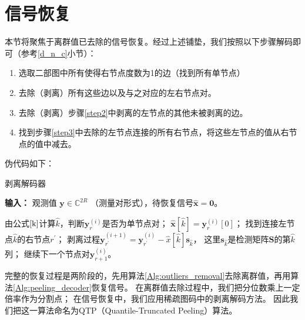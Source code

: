 \documentclass[AutoFakeBold]{LZUThesis}
\begin{document}
\section{信号恢复}
\label{solu}

本节将聚焦于离群值已去除的信号恢复。经过上述铺垫，我们按照以下步骤解码即可（参考\ref{d_n_c}小节）：

\begin{enumerate}[1) ]
    \item 选取二部图中所有使得右节点度数为1的边（找到所有单节点）
    \item \label{step2}去除（剥离）所有这些边以及与之对应的左右节点对。
    \item \label{step3}去除（剥离）步骤\ref{step2}中剥离的左节点的其他未被剥离的边。
    \item 找到步骤\ref{step3}中去除的左节点连接的所有右节点，将这些左节点的值从右节点的值中减去。
\end{enumerate}

伪代码如下：

\begin{algorithm}[H]
    \caption{剥离解码器\label{Alg:peeling_decoder}}
    \hspace*{0.02in} {\bf 输入：} 
    观测值 $ \mathbf{y} \in \mathbb{C}^{2R} $ （测量对形式），待恢复信号$\mathbf{\hat x} = \mathbf{0}$。
    \begin{algorithmic}[1]
            \State 由公式$\ref{k}$计算$\hat k$，判断$\mathbf{y}_r^{(i)}$是否为单节点对；
                    \State $\mathbf{\hat x}[\hat k] = \mathbf{y}_r^{(i)}[0]$；
                        \State 找到连接左节点$\hat k$的右节点$r^{\prime}$；
                        \State 剥离过程$\mathbf{y}_{r^{\prime}}^{(i+1)} = \mathbf{y}_{r^{\prime}}^{(i)} - \hat{x}[\hat k]\mathbf{s}_{\hat k}$，
                        这里$\mathbf{s}_{\hat k}$是检测矩阵$\mathbf{S}$的第$\hat k$列；
                    \EndFor
                \Else
                    \State 继续下一个节点对$\mathbf{y}_{r+1}^{(i)}$。
                \EndIf
            \EndFor
        \EndFor
    \end{algorithmic}
\end{algorithm}

完整的恢复过程是两阶段的，先用算法\ref{Alg:outliers_removal}去除离群值，再用算法\ref{Alg:peeling_decoder}恢复信号。
在离群值去除过程中，我们把分位数乘上一定倍率作为分割点；
在信号恢复中，我们应用稀疏图码中的剥离解码方法。
因此我们把这一算法命名为QTP（Quantile-Truncated Peeling）算法。
\end{document}
